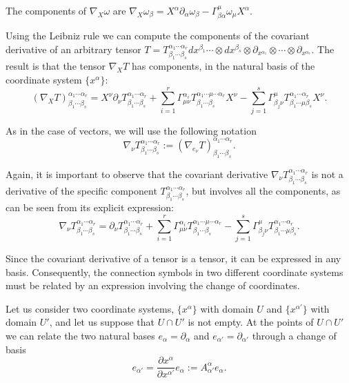 \begin{points}
\item The components of $\nabla_X\omega$ are $\nabla_X\omega_\beta=X^\alpha\partial_\alpha\omega_\beta-\Gamma^\mu_{\beta\alpha}\omega_\mu X^\alpha$.

\item Using the Leibniz rule we can compute the components of the covariant derivative of an arbitrary tensor $T=T^{\alpha_1\cdots\alpha_r}_{\beta_1\cdots\beta_s}dx^{\beta_1}\cdots\otimes dx^{\beta_s}\otimes\partial_{x^{\alpha_1}}\otimes\cdots\otimes\partial_{x^{\alpha_r}}$. The result is that the tensor $\nabla_XT$ has components, in the natural basis of the coordinate system $\{x^\alpha\}$:
\[
  (\nabla_XT)^{\alpha_1\cdots\alpha_r}_{\beta_1\cdots\beta_s}=X^\nu\partial_\nu T^{\alpha_1\cdots\alpha_r}_{\beta_1\cdots\beta_s}+\sum_{i=1}^r\Gamma^{\alpha_i}_{\mu\nu}T^{\alpha_1\cdots\mu\cdots\alpha_r}_{\beta_1\cdots\beta_s}X^\nu-\sum_{j=1}^s\Gamma^\mu_{\beta_j\nu}T^{\alpha_1\cdots\alpha_r}_{\beta_1\cdots\mu\beta_s}X^\nu .
\]

\item As in the case of vectors, we will use the following notation
\[
  \nabla_\nu T^{\alpha_1\cdots\alpha_r}_{\beta_1\cdots\beta_s}:=\left(\nabla_{e_\nu}T\right)^{\alpha_1\cdots\alpha_r}_{\beta_1\cdots\beta_s} .
\]

\item Again, it is important to observe that the covariant derivative $\nabla_\nu T^{\alpha_1\cdots\alpha_r}_{\beta_1\cdots\beta_s}$ is not a derivative of the specific component $T^{\alpha_1\cdots\alpha_r}_{\beta_1\cdots\beta_s}$, but involves all the components, as can be seen from its explicit expression:
\[
  \nabla_\nu T^{\alpha_1\cdots\alpha_r}_{\beta_1\cdots\beta_s}=\partial_\nu T^{\alpha_1\cdots\alpha_r}_{\beta_1\cdots\beta_s}+\sum_{i=1}^r\Gamma^{\alpha_i}_{\mu\nu}T^{\alpha_1\cdots\mu\cdots\alpha_r}_{\beta_1\cdots\beta_s}-\sum_{j=1}^s\Gamma^\mu_{\beta_j\nu}T^{\alpha_1\cdots\alpha_r}_{\beta_1\cdots\mu\beta_s} .
\]

\item Since the covariant derivative of a tensor is a tensor, it can be expressed in any basis. Consequently, the connection symbols in two different coordinate systems must be related by an expression involving the change of coordinates.

\item Let us consider two coordinate systems, $\{x^\alpha\}$ with domain $U$ and $\{x^{\alpha'}\}$ with domain $U'$, and let us suppose that $U\cap U'$ is not empty. At the points of $U\cap U'$ we can relate the two natural bases $e_\alpha=\partial_\alpha$ and $e_{\alpha'}=\partial_{\alpha'}$ through a change of basis
\[
  e_{\alpha'}=\frac{\partial x^\alpha}{\partial x^{\alpha'}}e_\alpha:=A^\alpha_{\alpha'}e_\alpha .
\]


\end{points}
